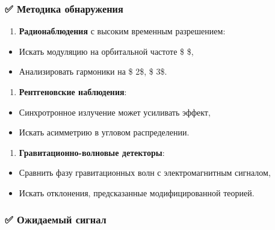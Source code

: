 \documentclass[11pt]{article}
\providecommand{\tightlist}{%
      \setlength{\itemsep}{0pt}\setlength{\parskip}{0pt}}
\begin{document}
\subsubsection{✅ Методика
обнаружения}\label{ux43cux435ux442ux43eux434ux438ux43aux430-ux43eux431ux43dux430ux440ux443ux436ux435ux43dux438ux44f}

\begin{enumerate}
\def\labelenumi{\arabic{enumi}.}
\tightlist
\item
  \textbf{Радионаблюдения} с высоким временным разрешением:
\end{enumerate}

\begin{itemize}
\tightlist
\item
  Искать модуляцию на орбитальной частоте \$ \omega \$,
\item
  Анализировать гармоники на \$ 2\omega \$, \$ 3\omega \$.
\end{itemize}

\begin{enumerate}
\def\labelenumi{\arabic{enumi}.}
\setcounter{enumi}{1}
\tightlist
\item
  \textbf{Рентгеновские наблюдения}:
\end{enumerate}

\begin{itemize}
\tightlist
\item
  Синхротронное излучение может усиливать эффект,
\item
  Искать асимметрию в угловом распределении.
\end{itemize}

\begin{enumerate}
\def\labelenumi{\arabic{enumi}.}
\setcounter{enumi}{2}
\tightlist
\item
  \textbf{Гравитационно-волновые детекторы}:
\end{enumerate}

\begin{itemize}
\tightlist
\item
  Сравнить фазу гравитационных волн с электромагнитным сигналом,
\item
  Искать отклонения, предсказанные модифицированной теорией.
\end{itemize}

\subsubsection{✅ Ожидаемый
сигнал}\label{ux43eux436ux438ux434ux430ux435ux43cux44bux439-ux441ux438ux433ux43dux430ux43b}
\end{document}
